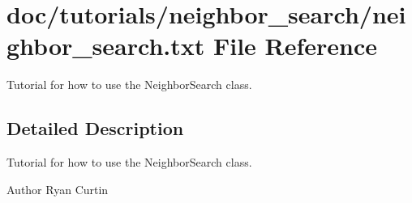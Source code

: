 \section{doc/tutorials/neighbor\+\_\+search/neighbor\+\_\+search.txt File Reference}
\label{neighbor__search_8txt}


Tutorial for how to use the Neighbor\+Search class.  




\subsection{Detailed Description}
Tutorial for how to use the Neighbor\+Search class. 

\begin{DoxyAuthor}{Author}
Ryan Curtin 
\end{DoxyAuthor}
